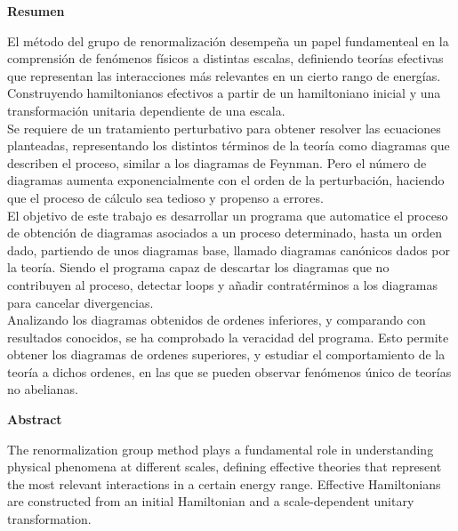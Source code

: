 \documentclass[11pt,a4paper,twoside,pdf]{article}
\numberwithin{equation}{section}
\begin{document}
\newpage
%
\begin{center}
{\bf Resumen}
\bigskip

\begin{minipage}{0.8\linewidth}

El método del grupo de renormalización desempeña un papel fundamenteal en la comprensión
de fenómenos físicos a distintas escalas, definiendo teorías efectivas que
representan las interacciones más relevantes en un cierto rango de energías. 
Construyendo hamiltonianos efectivos a partir de un hamiltoniano inicial y una transformación
unitaria dependiente de una escala.\\

Se requiere de un tratamiento perturbativo para obtener
resolver las ecuaciones planteadas, representando los distintos términos de la teoría como diagramas 
que describen el proceso, similar a los diagramas de Feynman. Pero el número de
diagramas aumenta exponencialmente con el orden de la perturbación, haciendo que
el proceso de cálculo sea tedioso y propenso a errores. \\

El objetivo de este trabajo es desarrollar un programa \cite{Liu_Computational_tools_for_2025} que automatice el proceso
de obtención de diagramas asociados a un proceso determinado, hasta un orden
dado, partiendo de unos diagramas base, llamado diagramas canónicos dados por la 
teoría. Siendo el programa capaz de descartar los diagramas que no contribuyen al 
proceso, detectar loops y añadir contratérminos a los diagramas para cancelar 
divergencias. \\

Analizando los diagramas obtenidos de ordenes inferiores, y comparando con 
resultados conocidos, se ha comprobado la veracidad del programa. Esto permite
obtener los diagramas de ordenes superiores, y estudiar el comportamiento de la 
teoría a dichos ordenes, en las que se pueden observar fenómenos único de teorías 
no abelianas.

\end{minipage}

\newpage

{\bf Abstract} 
\bigskip

\begin{minipage}{0.8\linewidth}
The renormalization group method plays a fundamental role in understanding
physical phenomena at different scales, defining effective theories that
represent the most relevant interactions in a certain energy range.
Effective Hamiltonians are constructed from an initial Hamiltonian and a scale-dependent
unitary transformation.\\


\end{minipage}
\end{center}
\end{document}
